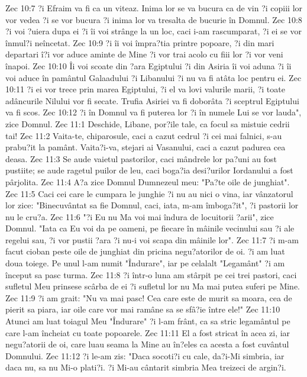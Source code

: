 Zec 10:7  ?i Efraim va fi ca un viteaz. Inima lor se va bucura ca de vin ?i copiii lor vor vedea ?i se vor bucura ?i inima lor va tresalta de bucurie în Domnul.
Zec 10:8  ?i voi ?uiera dupa ei ?i îi voi strânge la un loc, caci i-am rascumparat, ?i ei se vor înmul?i neîncetat.
Zec 10:9  ?i îi voi împra?tia printre popoare, ?i din mari departari î?i vor aduce aminte de Mine ?i vor trai acolo cu fiii lor ?i vor veni înapoi.
Zec 10:10  Îi voi scoate din ?ara Egiptului ?i din Asiria îi voi aduna ?i îi voi aduce în pamântul Galaadului ?i Libanului ?i nu va fi atâta loc pentru ei.
Zec 10:11  ?i ei vor trece prin marea Egiptului, ?i el va lovi valurile marii, ?i toate adâncurile Nilului vor fi secate. Trufia Asiriei va fi doborâta ?i sceptrul Egiptului va fi scos.
Zec 10:12  ?i în Domnul va fi puterea lor ?i în numele Lui se vor lauda", zice Domnul.
Zec 11:1  Deschide, Libane, por?ile tale, ca focul sa mistuie cedrii tai!
Zec 11:2  Vaita-te, chiparosule, caci a cazut cedrul ?i cei mai falnici, s-au prabu?it la pamânt. Vaita?i-va, stejari ai Vasanului, caci a cazut padurea cea deasa.
Zec 11:3  Se aude vaietul pastorilor, caci mândrele lor pa?uni au fost pustiite; se aude ragetul puilor de leu, caci boga?ia desi?urilor Iordanului a fost pârjolita.
Zec 11:4  A?a zice Domnul Dumnezeul meu: "Pa?te oile de junghiat".
Zec 11:5  Caci cei care le cumpara le junghie ?i nu au nici o vina, iar vânzatorul lor zice: "Binecuvântat sa fie Domnul, caci, iata, m-am îmboga?it", ?i pastorii lor nu le cru?a.
Zec 11:6  "?i Eu nu Ma voi mai îndura de locuitorii ?arii", zice Domnul. "Iata ca Eu voi da pe oameni, pe fiecare în mâinile vecinului sau ?i ale regelui sau, ?i vor pustii ?ara ?i nu-i voi scapa din mâinile lor".
Zec 11:7  ?i m-am facut cioban peste oile de junghiat din pricina negu?atorilor de oi. ?i am luat doua toiege. Pe unul l-am numit "Îndurare", iar pe celalalt "Legamânt" ?i am început sa pasc turma.
Zec 11:8  ?i într-o luna am stârpit pe cei trei pastori, caci sufletul Meu prinsese scârba de ei ?i sufletul lor nu Ma mai putea suferi pe Mine.
Zec 11:9  ?i am grait: "Nu va mai pasc! Cea care este de murit sa moara, cea de pierit sa piara, iar oile care vor mai ramâne sa se sfâ?ie între ele!"
Zec 11:10  Atunci am luat toiagul Meu "Îndurare" ?i l-am frânt, ca sa stric legamântul pe care l-am încheiat cu toate popoarele.
Zec 11:11  El a fost stricat în acea zi, iar negu?atorii de oi, care luau seama la Mine au în?eles ca acesta a fost cuvântul Domnului.
Zec 11:12  ?i le-am zis: "Daca socoti?i cu cale, da?i-Mi simbria, iar daca nu, sa nu Mi-o plati?i. ?i Mi-au cântarit simbria Mea treizeci de argin?i.
